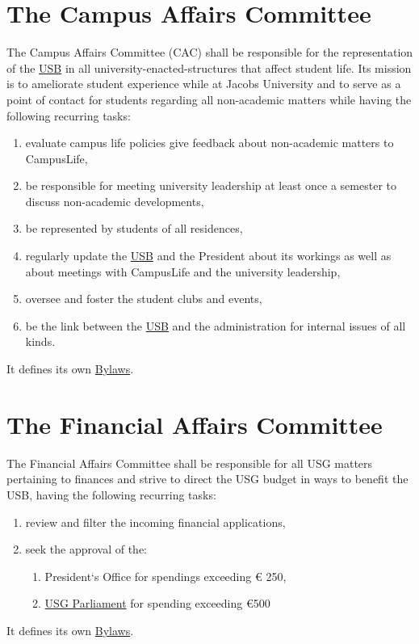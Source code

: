 \documentclass[12pt]{LaTeX_Misc/constitution}
\begin{document}
\section{The Campus Affairs Committee} 
\label{CACdef}
The Campus Affairs Committee (CAC) shall be responsible for the representation of the \hyperref[studentbody]{USB} in all university-enacted-structures that affect student life. Its mission is to ameliorate student experience while at Jacobs University and to serve as a point of contact for students regarding all non-academic matters while having the following recurring tasks:

\begin{enumerate}
\item evaluate campus life policies give feedback about non-academic matters to CampusLife,
\item be responsible for meeting university leadership at least once a semester to discuss non-academic developments,
\item be represented by students of all residences,
\item regularly update the \hyperref[studentbody]{USB} and the President about its workings as well as about meetings with CampusLife and the university leadership,
\item oversee and foster the student clubs and events,
\item be the link between the \hyperref[studentbody]{USB} and the administration for internal issues of all kinds.
\end{enumerate}
It defines its own \hyperref[CACByLawsdef]{Bylaws}.

\section{The Financial Affairs Committee}
\label{Financesdef}
The Financial Affairs Committee shall be responsible for all USG matters pertaining to finances and strive to direct the USG budget in ways to benefit the USB, having the following recurring tasks:
\begin{enumerate} 
\item review and filter the incoming financial applications,
\item seek the approval of the:
\begin{enumerate}
    \item President`s Office for spendings exceeding $\euro$ 250,
    \item \hyperref[USGParliamentDef]{USG Parliament} for spending exceeding $\euro$500
\end{enumerate}
\end{enumerate}
It defines its own \hyperref[FinByLawsdef]{Bylaws}.
\end{document}
